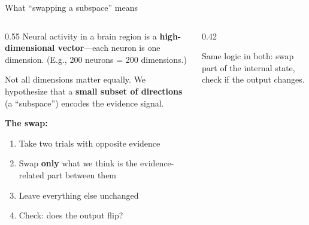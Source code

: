 \documentclass[aspectratio=169,11pt]{beamer}
\begin{document}
\begin{frame}{What ``swapping a subspace'' means}
\begin{columns}[T]
\begin{column}{0.55\textwidth}
{\small Neural activity in a brain region is a \textbf{high-dimensional vector}---each neuron is one dimension. (E.g., 200 neurons = 200 dimensions.)}

\vspace{0.3em}
{\small Not all dimensions matter equally. We hypothesize that a \textbf{small subset of directions} (a ``subspace'') encodes the evidence signal.}

\vspace{0.3em}
{\small \textbf{The swap:}}
\begin{enumerate}\setlength\itemsep{2pt}
  \item {\small Take two trials with opposite evidence}
  \item {\small Swap \textbf{only} what we think is the evidence-related part between them}
  \item {\small Leave everything else unchanged}
  \item {\small Check: does the output flip?}
\end{enumerate}

\end{column}
\begin{column}{0.42\textwidth}
\centering
{}

\vspace{0.3em}
{\small Same logic in both: swap part of the internal state, check if the output changes.}
\end{column}
\end{columns}
\end{frame}
\end{document}
